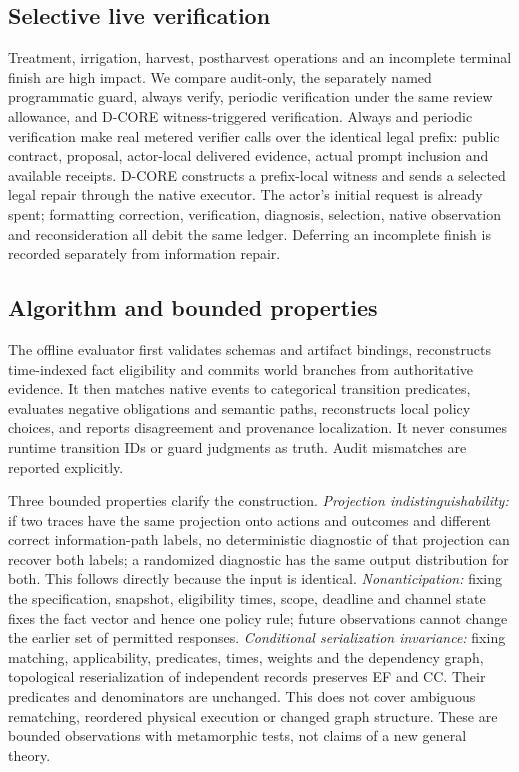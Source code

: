 \documentclass[sigconf,anonymous]{aamas}
\begin{document}
\subsection{Selective live verification}
Treatment, irrigation, harvest, postharvest operations and an incomplete terminal finish are high impact. We compare audit-only, the separately named programmatic guard, always verify, periodic verification under the same review allowance, and D-CORE witness-triggered verification. Always and periodic verification make real metered verifier calls over the identical legal prefix: public contract, proposal, actor-local delivered evidence, actual prompt inclusion and available receipts. D-CORE constructs a prefix-local witness and sends a selected legal repair through the native executor. The actor's initial request is already spent; formatting correction, verification, diagnosis, selection, native observation and reconsideration all debit the same ledger. Deferring an incomplete finish is recorded separately from information repair.

\subsection{Algorithm and bounded properties}
The offline evaluator first validates schemas and artifact bindings, reconstructs time-indexed fact eligibility and commits world branches from authoritative evidence. It then matches native events to categorical transition predicates, evaluates negative obligations and semantic paths, reconstructs local policy choices, and reports disagreement and provenance localization. It never consumes runtime transition IDs or guard judgments as truth. Audit mismatches are reported explicitly.

Three bounded properties clarify the construction. \emph{Projection indistinguishability:} if two traces have the same projection onto actions and outcomes and different correct information-path labels, no deterministic diagnostic of that projection can recover both labels; a randomized diagnostic has the same output distribution for both. This follows directly because the input is identical. \emph{Nonanticipation:} fixing the specification, snapshot, eligibility times, scope, deadline and channel state fixes the fact vector and hence one policy rule; future observations cannot change the earlier set of permitted responses. \emph{Conditional serialization invariance:} fixing matching, applicability, predicates, times, weights and the dependency graph, topological reserialization of independent records preserves EF and CC. Their predicates and denominators are unchanged. This does not cover ambiguous rematching, reordered physical execution or changed graph structure. These are bounded observations with metamorphic tests, not claims of a new general theory.
\end{document}
